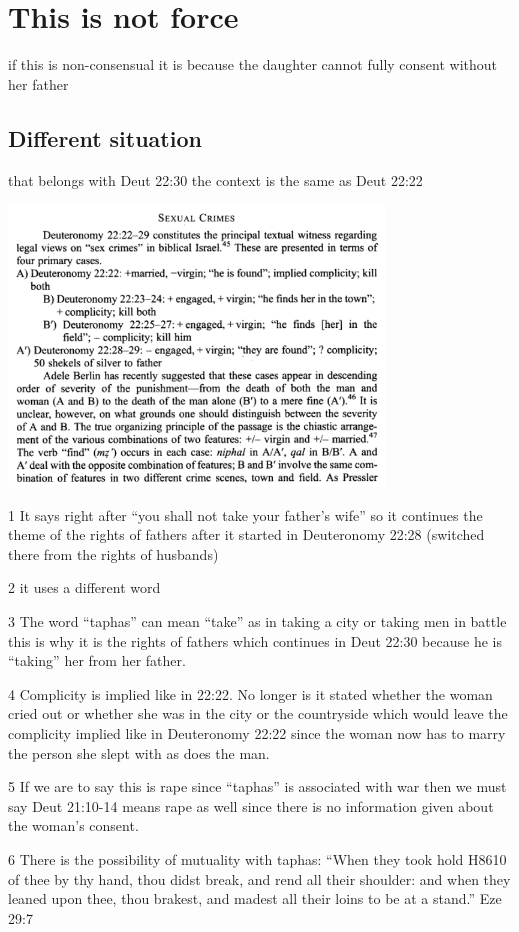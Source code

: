\documentclass[11pt]{article}
\begin{document}
{\section{This is not force}

 if this is non-consensual it is because the daughter cannot fully consent without her father
\subsection{Different situation}
that belongs with Deut 22:30 the context is the same as Deut 22:22

\includegraphics[width=10cm]{sexual_crimes}


1 It says right after “you shall not take your father’s wife” so it continues the theme of the rights of fathers after it started in Deuteronomy 22:28 (switched there from the rights of husbands)

2 it uses a different word

3 The word “taphas” can mean “take” as in taking a city or taking men in battle this is why it is the rights of fathers which continues in Deut 22:30 because he is “taking” her from her father.

4 Complicity is implied like in 22:22. No longer is it stated whether the woman cried out or whether she was in the city or the countryside which would leave the complicity implied like in Deuteronomy 22:22 since the woman now has to marry the person she slept with as does the man.

5 If we are to say this is rape since “taphas” is associated with war then we must say Deut 21:10-14 means rape as well since there is no information given about the woman’s consent.

6 There is the possibility of mutuality with taphas: “When they took hold H8610 of thee by thy hand, thou didst break, and rend all their shoulder: and when they leaned upon thee, thou brakest, and madest all their loins to be at a stand.” Eze 29:7

}
\end{document}
